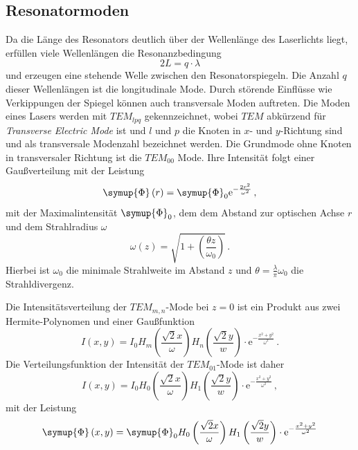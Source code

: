 \subsection*{Resonatormoden}
Da die Länge des Resonators deutlich über der Wellenlänge des Laserlichts liegt, erfüllen viele Wellenlängen die 
Resonanzbedingung 
\begin{equation*}
    2 L = q \cdot \lambda 
\end{equation*}
und erzeugen eine stehende Welle zwischen den Resonatorspiegeln. Die Anzahl $q$ dieser Wellenlängen ist die longitudinale
Mode. Durch störende Einflüsse wie Verkippungen der Spiegel können auch transversale Moden auftreten.
Die Moden eines Lasers werden mit $TEM_{lpq}$ gekennzeichnet, wobei $TEM$ abkürzend für \textit{Transverse Electric Mode} ist
und $l$ und $p$ die Knoten in $x$- und $y$-Richtung sind und als transversale Modenzahl bezeichnet werden.
Die Grundmode ohne Knoten in transversaler Richtung ist die $TEM_{00}$ Mode. Ihre Intensität folgt einer
Gaußverteilung mit der Leistung
\begin{equation*}
    \symup{\Phi} \left(r\right) = \symup{\Phi}_0 \text{e}^{-\frac{2 r^2}{\omega^2}} \, ,
\end{equation*}
mit der Maximalintensität $\symup{\Phi}_0$, dem dem Abstand zur optischen Achse $r$ und dem Strahlradius $\omega$
\begin{equation*}
    \omega \left(z\right) = \sqrt{1 + \left(\frac{\theta z}{\omega_0}\right)} \, .
\end{equation*}
Hierbei ist $\omega_0$ die minimale Strahlweite im Abstand $z$ und $\theta = \frac{\lambda}{\pi} \omega_0$ die Strahldivergenz.

Die Intensitätsverteilung der $TEM_{m,n}$-Mode bei $z = 0$ ist ein Produkt aus zwei Hermite-Polynomen und einer Gaußfunktion
\begin{equation*}
    I\left(x, y\right) = I_0 H_m \left(\frac{\sqrt{2} x}{\omega}\right) H_n \left(\frac{\sqrt{2} y}{w}\right)\cdot \text{e}^{- \frac{x^2 + y^2}{\omega^2}} \, .
\end{equation*}
Die Verteilungsfunktion der Intensität der $TEM_{01}$-Mode ist daher
\begin{equation}
    \label{eq:kermit}
    I\left(x, y\right) = I_0 H_0 \left(\frac{\sqrt{2} x}{\omega}\right) H_1 \left(\frac{\sqrt{2} y}{w}\right)\cdot \text{e}^{- \frac{x^2 + y^2}{\omega^2}} \, ,
\end{equation}
mit der Leistung
\begin{equation*}
    \symup{\Phi} \left(x, y\right) = \symup{\Phi}_0 H_0 \left(\frac{\sqrt{2} x}{\omega}\right) H_1 \left(\frac{\sqrt{2} y}{w}\right)\cdot \text{e}^{- \frac{x^2 + y^2}{\omega^2}}
\end{equation*}

